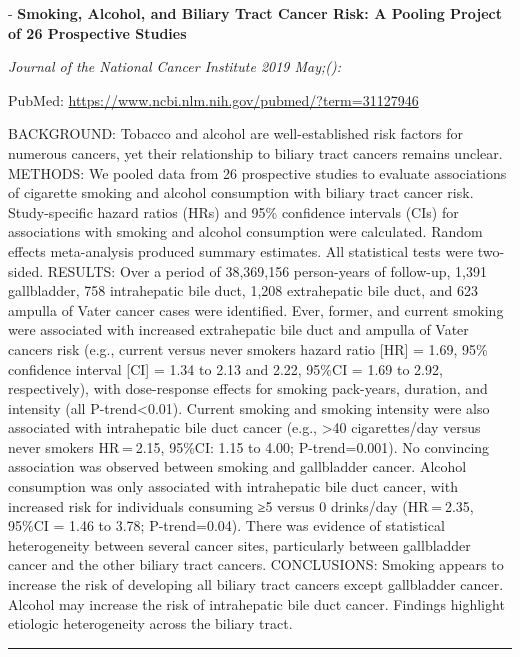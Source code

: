 \documentclass[]{article}
\begin{document}
 - \textbf{Smoking, Alcohol, and Biliary Tract Cancer Risk: A Pooling
Project of 26 Prospective Studies}

\emph{Journal of the National Cancer Institute 2019 May;():}

PubMed: \url{https://www.ncbi.nlm.nih.gov/pubmed/?term=31127946}

BACKGROUND: Tobacco and alcohol are well-established risk factors for
numerous cancers, yet their relationship to biliary tract cancers
remains unclear. METHODS: We pooled data from 26 prospective studies to
evaluate associations of cigarette smoking and alcohol consumption with
biliary tract cancer risk. Study-specific hazard ratios (HRs) and 95\%
confidence intervals (CIs) for associations with smoking and alcohol
consumption were calculated. Random effects meta-analysis produced
summary estimates. All statistical tests were two-sided. RESULTS: Over a
period of 38,369,156 person-years of follow-up, 1,391 gallbladder, 758
intrahepatic bile duct, 1,208 extrahepatic bile duct, and 623 ampulla of
Vater cancer cases were identified. Ever, former, and current smoking
were associated with increased extrahepatic bile duct and ampulla of
Vater cancers risk (e.g., current versus never smokers hazard ratio
{[}HR{]} = 1.69, 95\% confidence interval {[}CI{]} = 1.34 to 2.13 and
2.22, 95\%CI = 1.69 to 2.92, respectively), with dose-response effects
for smoking pack-years, duration, and intensity (all
P-trend\textless{}0.01). Current smoking and smoking intensity were also
associated with intrahepatic bile duct cancer (e.g., \textgreater{}40
cigarettes/day versus never smokers HR = 2.15, 95\%CI: 1.15 to 4.00;
P-trend=0.001). No convincing association was observed between smoking
and gallbladder cancer. Alcohol consumption was only associated with
intrahepatic bile duct cancer, with increased risk for individuals
consuming ≥5 versus 0 drinks/day (HR = 2.35, 95\%CI = 1.46 to 3.78;
P-trend=0.04). There was evidence of statistical heterogeneity between
several cancer sites, particularly between gallbladder cancer and the
other biliary tract cancers. CONCLUSIONS: Smoking appears to increase
the risk of developing all biliary tract cancers except gallbladder
cancer. Alcohol may increase the risk of intrahepatic bile duct cancer.
Findings highlight etiologic heterogeneity across the biliary tract.

{}

{}

\begin{center}\rule{0.5\linewidth}{\linethickness}\end{center}
\end{document}
